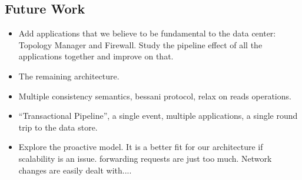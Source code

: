 \subsection{Future Work}
\begin{itemize}
\item Add applications that we believe to be fundamental to the data center: Topology Manager and Firewall.  Study the pipeline effect of all the applications together and improve on that. 
\item The remaining architecture. 
\item Multiple consistency semantics, bessani protocol, relax on reads operations. 
\item ``Transactional Pipeline'', a single event, multiple applications, a single round trip to the data store. 
\item Explore the proactive model. It is a better fit for our architecture if scalability is an issue. forwarding requests are just too much. Network changes are easily dealt with.... 

\end{itemize}


